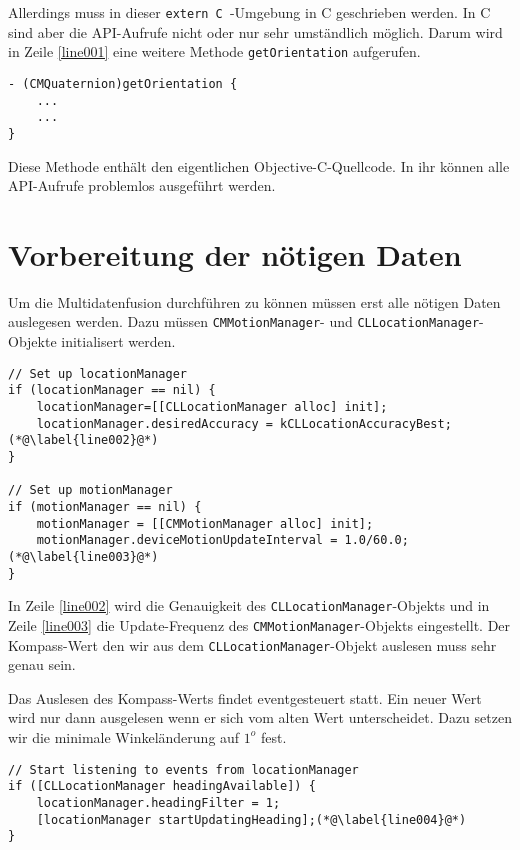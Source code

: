 Allerdings muss in dieser \texttt{extern  C }-Umgebung in C geschrieben werden. In C sind aber die API-Aufrufe nicht oder nur sehr umständlich möglich. Darum wird in Zeile \ref{line001} eine weitere Methode \texttt{getOrientation} aufgerufen. 
~\\
\begin{lstlisting}[float=htb, caption=Methode \texttt{getOrientation}]
- (CMQuaternion)getOrientation {
	...
	...
}
\end{lstlisting}

Diese Methode enthält den eigentlichen Objective-C-Quellcode. In ihr können alle API-Aufrufe problemlos ausgeführt werden.

\cite{unity}

  
\section{Vorbereitung der nötigen Daten}
Um die Multidatenfusion durchführen zu können müssen erst alle nötigen Daten auslegesen werden. Dazu müssen \texttt{CMMotionManager}- und \texttt{CLLocationManager}-Objekte initialisert werden. 
~\\
\begin{lstlisting}[float=htb, caption=\texttt{locationManager} und \texttt{motionManager} initialisieren \cite{apple:003}]
// Set up locationManager
if (locationManager == nil) {
	locationManager=[[CLLocationManager alloc] init];
	locationManager.desiredAccuracy = kCLLocationAccuracyBest;(*@\label{line002}@*)
}
    
// Set up motionManager    
if (motionManager == nil) {
	motionManager = [[CMMotionManager alloc] init];
	motionManager.deviceMotionUpdateInterval = 1.0/60.0;(*@\label{line003}@*)
}
\end{lstlisting}

In Zeile \ref{line002} wird die Genauigkeit des \texttt{CLLocationManager}-Objekts und in Zeile \ref{line003} die Update-Frequenz des \texttt{CMMotionManager}-Objekts eingestellt. Der Kompass-Wert den wir aus dem \texttt{CLLocationManager}-Objekt auslesen muss sehr genau sein.


Das Auslesen des Kompass-Werts findet eventgesteuert statt. Ein neuer Wert wird nur dann ausgelesen wenn er sich vom alten Wert unterscheidet. Dazu setzen wir die minimale Winkeländerung auf $1^o$ fest.
~\\
\begin{lstlisting}[float=htb, caption=\texttt{locationManager} starten \cite{apple:003}]
// Start listening to events from locationManager
if ([CLLocationManager headingAvailable]) {
	locationManager.headingFilter = 1;
	[locationManager startUpdatingHeading];(*@\label{line004}@*)
}
\end{lstlisting}

